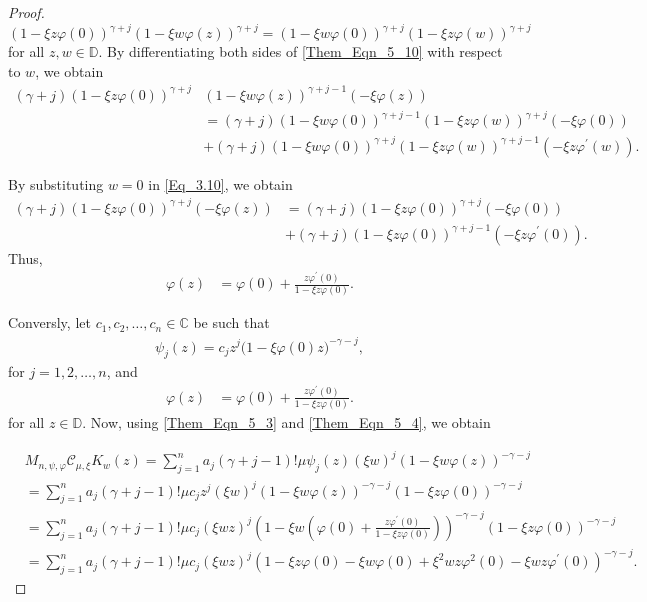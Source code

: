 \documentclass[12pt, reqno]{amsart}
\theoremstyle{definition}
\theoremstyle{remark}
\numberwithin{equation}{section}
\begin{document}
\begin{proof}
\begin{equation}\label{Them_Eqn_5_10}
(1-\xi z\varphi(0))^{\gamma+j}(1-\xi w\varphi(z))^{\gamma+j}=(1-\xi w\varphi(0))^{\gamma+j}(1-\xi z\varphi(w))^{\gamma+j}
\end{equation}
for all $z,w\in \mathbb{D}$. By differentiating both sides of \eqref{Them_Eqn_5_10} with respect to $w$, we obtain
\begin{align}\label{Eq_3.10}
(\gamma+j)(1-\xi z\varphi(0))^{\gamma+j}&(1-\xi w\varphi(z))^{\gamma+j-1}(-\xi \varphi(z))\nonumber\\
&=(\gamma+j)(1-\xi w\varphi(0))^{\gamma+j-1}(1-\xi z\varphi(w))^{\gamma+j}(-\xi \varphi(0))\nonumber\\
&+(\gamma+j)(1-\xi w\varphi(0))^{\gamma+j}(1-\xi z\varphi(w))^{\gamma+j-1}(-\xi z\varphi^\prime(w)).
\end{align}

By substituting $w=0$ in \eqref{Eq_3.10}, we obtain
\begin{align*}
(\gamma+j)(1-\xi z\varphi(0))^{\gamma+j}(-\xi \varphi(z))
&=(\gamma+j)(1-\xi z\varphi(0))^{\gamma+j}(-\xi \varphi(0))\\
&+(\gamma+j)(1-\xi z\varphi(0))^{\gamma+j-1}(-\xi z\varphi^\prime(0)).
\end{align*} 
Thus,
\begin{align*}
	\varphi(z)&=\varphi(0)+\frac{z\varphi^\prime(0)}{1-\xi z\varphi(0)}.	
\end{align*}

Conversly, let $c_1, c_2, \dots, c_n \in \mathbb{C}$ be such that  
\begin{gather*}
\psi_j(z)=c_jz^{j}\big(1-\xi \varphi(0) z\big)^{-\gamma-j},
\end{gather*}
for $j=1, 2, \dots, n$, and
\begin{align*}
\varphi(z)&=\varphi(0)+\frac{z\varphi^\prime(0)}{1-\xi z\varphi(0)}.	
\end{align*}
for all $z\in \mathbb{D}$. Now, using \eqref{Them_Eqn_5_3} and \eqref{Them_Eqn_5_4}, we obtain

\begin{align}\label{Them_Eqn_5_11}
&M_{n,\psi, \varphi}\mathcal{C}_{\mu, \xi}K_w(z)
=\displaystyle\sum_{j=1}^{n}a_j(\gamma+j-1)!\mu \psi_j(z)(\xi w)^{j}(1-\xi w\varphi(z))^{-\gamma-j}\nonumber\\
&=\displaystyle\sum_{j=1}^{n}a_j(\gamma+j-1)!\mu c_jz^j(\xi w)^{j}(1-\xi w\varphi(z))^{-\gamma-j}(1-\xi z\varphi(0))^{-\gamma-j}\nonumber\\
&=\displaystyle\sum_{j=1}^{n}a_j(\gamma+j-1)!\mu c_j(\xi wz)^{j}\left(1-\xi w\left(\varphi(0)+\frac{z\varphi^\prime(0)}{1-\xi z\varphi(0)}\right)\right)^{-\gamma-j}(1-\xi z\varphi(0))^{-\gamma-j}\nonumber\\
&=\displaystyle\sum_{j=1}^{n}a_j(\gamma+j-1)!\mu c_j(\xi wz)^{j}\left(1-\xi z\varphi(0)-\xi w\varphi(0)+\xi^2wz\varphi^2(0)-\xi wz\varphi^\prime(0)\right)^{-\gamma-j}.
\end{align}


\end{proof}
\end{document}
